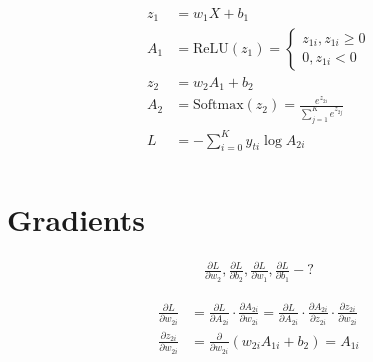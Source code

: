\documentclass{article}
\begin{document}
\begin{align*}
z_1 &= w_1 X + b_1 \\
A_1 &= \text{ReLU}(z_1) = \begin{cases}
z_{1i}, z_{1i} \geq 0 \\
0, z_{1i} < 0
\end{cases}\\
z_2 &= w_2 A_1 + b_2 \\
A_2 &= \text{Softmax}(z_2) = \frac{e^{z_{2i}}}{\sum_{j=1}^K e^{z_{2j}}} \\
L &= -\sum_{i=0}^{K} y_{ti} \log A_{2i} \\
\end{align*}

\section*{Gradients}

\begin{align*}
\frac{\partial L}{\partial w_2} ,
\frac{\partial L}{\partial b_2} ,
\frac{\partial L}{\partial w_1} ,
\frac{\partial L}{\partial b_1} - ?
\end{align*}

\begin{align*}
\frac{\partial L}{\partial w_{2i}} &= \frac{\partial L}{\partial A_{2i}} \cdot \frac{\partial A_{2i}}{\partial w_{2i}} = \frac{\partial L}{\partial A_{2i}} \cdot \frac{\partial A_{2i}}{\partial z_{2i}} \cdot \frac{\partial z_{2i}}{\partial w_{2i}} \\
\frac{\partial z_{2i}}{\partial w_{2i}} &= \frac{\partial}{\partial w_{2i}} (w_{2i} A_{1i} + b_2) = A_{1i}
\end{align*}
\end{document}
